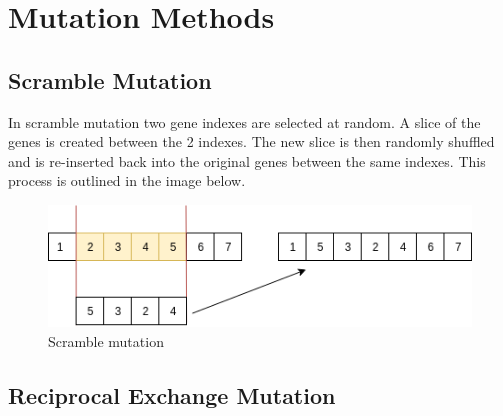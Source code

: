 \section{Mutation Methods}

\subsection{Scramble Mutation}

In scramble mutation two gene indexes are selected at random. A slice of the genes is created between the 2 indexes. The new slice is then randomly shuffled and is re-inserted back into the original genes between the same indexes. This process is outlined in the image below.

\begin{figure}[h!]
\vspace{-5pt}
\centering
\includegraphics[width=1.0\textwidth]{images/scramble.png}
\caption{\label{fig:3col_graph}Scramble mutation}
\end{figure}

\subsection{Reciprocal Exchange Mutation}
